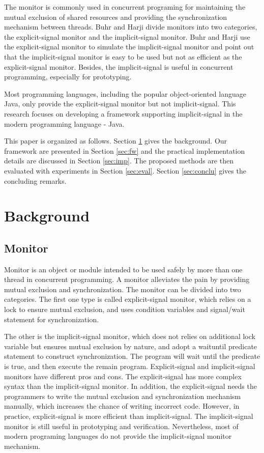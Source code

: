 \documentclass[preprint]{sigplanconf}
\begin{document}
The monitor \cite{hoa74} is commonly used in concurrent programing for 
maintaining the mutual exclusion of shared resources and providing the 
synchronization mechanism between threads. Buhr and Harji \cite{bh05} divide 
monitors into two categories, the explicit-signal monitor and the 
implicit-signal monitor. Buhr and Harji use the explicit-signal monitor to 
simulate the implicit-signal monitor and point out that the implicit-signal 
monitor is easy to be used but not as efficient as the explicit-signal monitor.
Besides, the implicit-signal is useful in concurrent programming, especially 
for prototyping. 


Most programming languages, including the popular object-oriented language Java,
only provide the explicit-signal monitor but not implicit-signal. This research 
focuses on developing a framework supporting implicit-signal in the modern 
programming language - Java. 

This paper is organized as follows. Section \ref{sec:bg} gives the background. 
Our framework are presented in Section \ref{sec:fw} and the practical 
implementation details are discussed in Section \ref{sec:imp}. The proposed 
methods are then evaluated with experiments in Section \ref{sec:eval}. 
Section \ref{sec:conclu} gives the concluding remarks.

\section{Background} \label{sec:bg}


\subsection{Monitor}
Monitor is an object or module intended to be used safely by more than one 
thread in concurrent programming. A monitor alleviates the pain by providing mutual 
exclusion and synchronization. The monitor can be divided into two categories. The first 
one type is called explicit-signal monitor, which relies on a lock to ensure mutual 
exclusion, and uses condition variables and signal/wait statement for synchronization.

The other is the implicit-signal monitor, which does not relies on additional lock variable 
but ensures mutual exclusion by nature, and adopt a waituntil predicate statement to 
construct synchronization. The program will wait until the predicate is true, and then 
execute the remain program. Explicit-signal and implicit-signal monitors have different 
pros and cons. The explicit-signal has more complex syntax than the implicit-signal 
monitor. In addition, the explicit-signal needs the programmers to write the mutual 
exclusion and synchronization mechanism manually, which increases the chance of
writing incorrect code. However, in practice, explicit-signal is more efficient than 
implicit-signal. The implicit-signal monitor is still useful in prototyping and verification. 
Nevertheless, most of modern programing languages do not provide the implicit-signal 
monitor mechanism.
\end{document}
